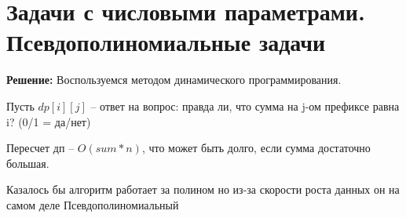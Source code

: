 \documentclass[40pt]{article}
\begin{document}
\section{Задачи с числовыми параметрами. Псевдополиномиальные задачи}

 \par \textbf{Решение:} Воспользуемся методом динамического программирования. 
    \par Пусть $dp[i][j]$ -- ответ на вопрос: правда ли, что сумма на j-ом префиксе равна i? (0/1 = да/нет)
    \par Пересчет дп -- $O(sum * n)$, что может быть долго, если сумма достаточно большая.
 
    \par Казалось бы алгоритм работает за полином но из-за скорости роста данных он на самом деле Псевдополиномиальный
\end{document}
